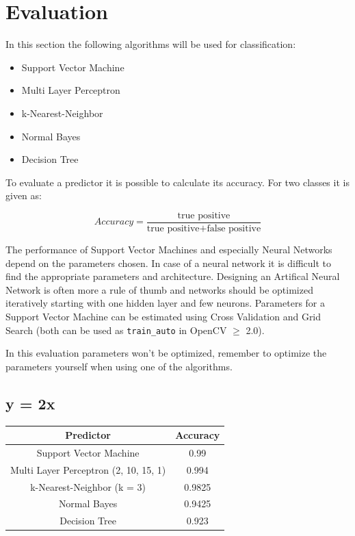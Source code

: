 \section{Evaluation}
In this section the following algorithms will be used for classification:
\begin{itemize}
 \item Support Vector Machine
 \item Multi Layer Perceptron
 \item k-Nearest-Neighbor
 \item Normal Bayes
 \item Decision Tree
\end{itemize}

To evaluate a predictor it is possible to calculate its accuracy. For two classes it is given as:

$$Accuracy = \frac{\mbox{true positive}}{\mbox{true positive} + \mbox{false positive}}$$

The performance of Support Vector Machines and especially Neural Networks depend on the parameters chosen. In case of a neural network it is difficult to find the appropriate parameters and architecture. Designing an Artifical Neural Network is often more a rule of thumb and networks should be optimized iteratively starting with one hidden layer and few neurons. Parameters for a Support Vector Machine can be estimated using Cross Validation and Grid Search (both can be used as \lstinline|train_auto| in OpenCV $\geq$ 2.0).

In this evaluation parameters won't be optimized, remember to optimize the parameters yourself when using one of the algorithms.


\subsection{y = 2x}

\begin{tabular}{|c|c|}
\hline
Predictor &	 Accuracy\\ \hline\hline
Support Vector Machine &	0.99\\ \hline
Multi Layer Perceptron (2, 10, 15, 1) & 0.994\\ \hline
k-Nearest-Neighbor (k = 3) & 0.9825\\ \hline
Normal Bayes &	0.9425 \\ \hline
Decision Tree &	0.923\\ \hline
\end{tabular}

